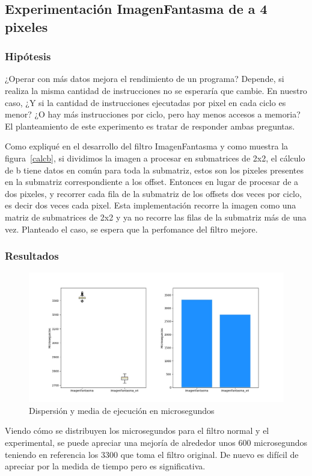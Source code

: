 \subsection{Experimentación ImagenFantasma de a 4 pixeles}
\subsubsection{Hipótesis}
¿Operar con más datos mejora el rendimiento de un programa? Depende, si realiza la misma cantidad de instrucciones no se esperaría que cambie.
En nuestro caso, ¿Y si la cantidad de instrucciones ejecutadas por pixel en cada ciclo es menor? ¿O hay más instrucciones por ciclo, pero hay menos accesos a memoria?
El planteamiento de este experimento es tratar de responder ambas preguntas.

Como expliqué en el desarrollo del filtro ImagenFantasma y como muestra la figura~\ref{calcb}, si dividimos la imagen a procesar en submatrices de 2x2, el cálculo de b tiene datos en común para toda la submatriz, estos son los pixeles presentes en la submatriz correspondiente a los offset.
Entonces en lugar de procesar de a dos pixeles, y recorrer cada fila de la submatriz de los offsets dos veces  por ciclo, es decir dos veces cada pixel.
Esta implementación recorre la imagen como una matriz de submatrices de 2x2 y ya no recorre las filas de la submatriz más de una vez.
Planteado el caso, se espera que la perfomance del filtro mejore.

\subsubsection{Resultados}
\begin{figure}[h]
    \begin{center}
	\includegraphics[scale=0.55]{img/x41.jpeg}
	\end{center}
	\caption{Dispersión y media de ejecución en microsegundos}
	\label{exp2_m}
\end{figure}
Viendo cómo se distribuyen los microsegundos para el filtro normal y el experimental, se puede apreciar una mejoría de alrededor unos 600 microsegundos teniendo en referencia los 3300 que toma el filtro original. De nuevo es difícil de apreciar por la medida de tiempo pero es significativa.

